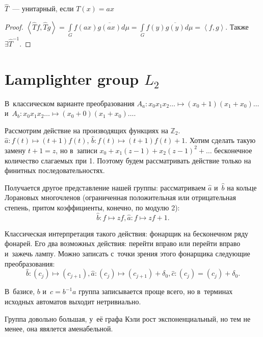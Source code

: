 \documentclass{article}
\begin{document}
\begin{lemma}
	$\hat{T}$~--- унитарный, если $T(x) = ax$
\end{lemma}
\begin{proof}
	$\left< \hat{T}f, \hat{T}g \right> = \int\limits_G f(ax) \overline{g(ax)} d\mu = \int\limits_G
	f(y) \overline{g(y)} d\mu = \left<f, g\right>$. Также $\exists \hat{T}^{-1}$.
\end{proof}

\section{Lamplighter group $L_2$}

В~классическом варианте преобразования $A_a: x_0 x_1 x_2 \ldots \mapsto (x_0 + 1)(x_1 + x_0) \ldots$
и~$A_b: x_0 x_1 x_2 \ldots \mapsto (x_0 + 0)(x_1 + x_0) \ldots$.

Рассмотрим действие на производящих функциях на $\mathbb{Z}_2$. $\hat{a}: f(t) \mapsto (t+1)f(t)$,
$\hat{b}: f(t) \mapsto (t+1)f(t) + 1$. Хотим сделать такую замену $t + 1 = z$, но в~записи $x_0 +
x_1 (z - 1) + x_2 (z - 1)^2 + \ldots$ бесконечное количество слагаемых при 1. Поэтому будем
рассматривать действие только на финитных последовательностях.

Получается другое представление нашей группы: рассматриваем $\hat{a}$ и~$\hat{b}$ на кольце
Лорановых многочленов (ограниченная положительная или отрицательная степень, притом коэффициенты,
конечно, по модулю 2):
$$\hat{b}: f \mapsto zf, \hat{a}: f \mapsto zf + 1.$$

Классическая интерпретация такого действия: фонарщик на бесконечном ряду фонарей. Его два возможных
действия: перейти вправо или перейти вправо и~зажечь лампу. Можно записать с~точки зрения этого
фонарщика следующие преобразования:
$$\hat{b}: (c_j) \mapsto (c_{j+1}), \hat{a}: (c_j) \mapsto (c_{j+1}) + \delta_0, \hat{c}: (c_j) =
(c_j) + \delta_0.$$

В~базисе, $b$ и~$c = b^{-1}a$ группа записывается проще всего, но в~терминах исходных автоматов
выходит нетривиально.

Группа довольно большая, у~её графа Кэли рост экспоненциальный, но тем не менее, она явялется
аменабельной.
\end{document}
